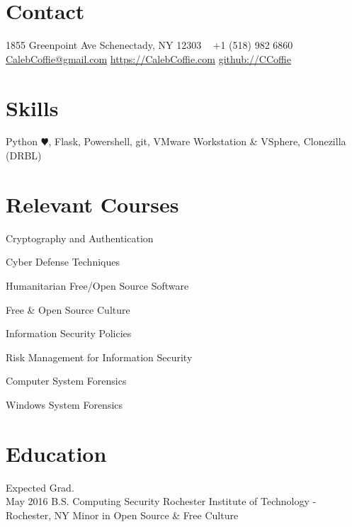 \documentclass[]{CalebCoffie-CV-Class} %
\begin{document}


\begin{aside} %
\section{Contact}
1855 Greenpoint Ave
Schenectady, NY 12303
~
+1 (518) 982 6860
~
\href{mailto:CalebCoffie@gmail.com}{CalebCoffie@gmail.com}
\href{https://CalebCoffie.com}{https://CalebCoffie.com}
\href{https://github.com/johnsmith}{github://CCoffie}
\section{Skills}
Python{\color{black} $\varheartsuit$}, Flask, Powershell, git, VMware Workstation \& VSphere, Clonezilla (DRBL)
\section{Relevant Courses}
\item Cryptography and Authentication
\item Cyber Defense Techniques
\item Humanitarian Free/Open Source Software
\item Free \& Open Source Culture
\item Information Security Policies
\item Risk Management for Information Security
\item Computer System Forensics
\item Windows System Forensics
\end{aside}


\section{Education}

\begin{entrylist}
\entry
{Expected Grad.\\May 2016}
{B.S. {\normalfont Computing Security}}
{Rochester Institute of Technology - Rochester, NY}
{Minor in Open Source \& Free Culture}
\end{entrylist}
\end{document}
